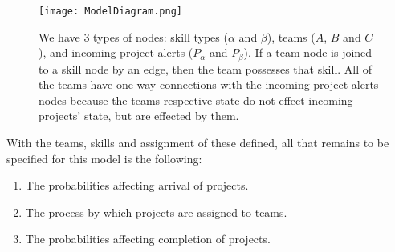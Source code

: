 \begin{figure}[h]
	\centering

	\texttt{[image: ModelDiagram.png]}
	\caption{We have 3 types of nodes: skill types ($\alpha$ and $\beta$), teams ($A$, $B$ and $C$), and incoming project alerts ($P_\alpha$ and $P_\beta$). If a team node is joined to a skill node by an edge, then the team possesses that skill. All of the teams have one way connections with the incoming project alerts nodes because the teams respective state do not effect incoming projects' state, but are effected by them.}
	\label{fig:diagram1}
\end{figure}

With the teams, skills and assignment of these defined, all that remains to be specified for this model is the following:

\begin{enumerate}
	\item The probabilities affecting arrival of projects.
	\item The process by which projects are assigned to teams.
	\item The probabilities affecting completion of projects.
\end{enumerate}

